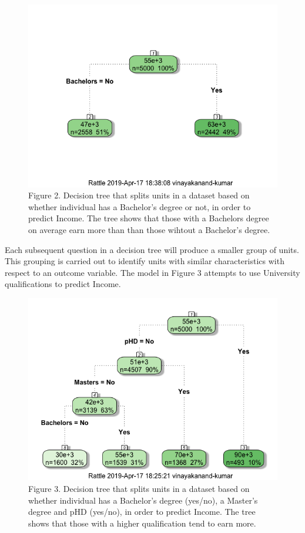 \documentclass[]{book}
\begin{document}
\begin{figure}
\centering
\includegraphics{images/dt_bach.png}
\caption{Figure 2. Decision tree that splits units in a dataset based on
whether individual has a Bachelor's degree or not, in order to predict
Income. The tree shows that those with a Bachelors degree on average
earn more than than those wihtout a Bachelor's degree.}
\end{figure}

Each subsequent question in a decision tree will produce a smaller group
of units. This grouping is carried out to identify units with similar
characteristics with respect to an outcome variable. The model in Figure
3 attempts to use University qualifications to predict Income.

\begin{figure}
\centering
\includegraphics{images/dt_all.png}
\caption{Figure 3. Decision tree that splits units in a dataset based on
whether individual has a Bachelor's degree (yes/no), a Master's degree
and pHD (yes/no), in order to predict Income. The tree shows that those
with a higher qualification tend to earn more.}
\end{figure}
\end{document}
